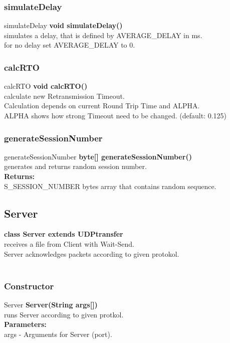 \documentclass[12pt]{article}
\begin{document}
\subsubsection{simulateDelay}
\begin{mybox}[colback=white]{simulateDelay}
\textbf{void simulateDelay()} \\
simulates a delay, that is defined by AVERAGE\_DELAY in ms. \\
for no delay set AVERAGE\_DELAY to 0.
\end{mybox}

\subsubsection{calcRTO}
\begin{mybox}[colback=white]{calcRTO}
\textbf{void calcRTO()} \\
calculate new Retransmission Timeout. \\
Calculation depends on current Round Trip Time and ALPHA. \\
ALPHA shows how strong Timeout need to be changed. (default: 0.125)
\end{mybox}

\subsubsection{generateSessionNumber}
\begin{mybox}[colback=white]{generateSessionNumber}
\textbf{byte[] generateSessionNumber()}  \\
generates and returns random session number. \\
\textbf{Returns:} \\
S\_SESSION\_NUMBER bytes array that contains random sequence.
\end{mybox}

\subsection{Server}

\textbf{\Large class Server extends UDPtransfer} \\
receives a file from Client with Wait-Send. \\
Server acknowledges packets according to given protokol.
\\ \\

\subsubsection{Constructor}
\begin{mybox}[colback=atomictangerine]{Server}
\textbf{Server(String args[])} \\
runs Server according to given protkol.
\\
\textbf{Parameters:} \\
args - Arguments for Server (port).
\end{mybox}
\end{document}
